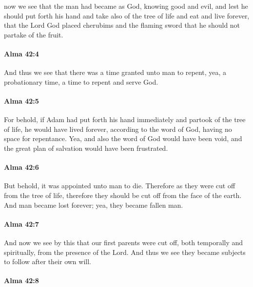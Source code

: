 			now we see that the man had became as God, knowing good and evil,
			and lest he should put forth his hand
			and take also of the tree of life and eat and live forever,
			that the Lord God placed cherubims and the flaming sword
			that he should not partake of the fruit.

		\paragraph{Alma 42:4} %
			\label{ALMA-42-4}

			And thus we see that there was a time granted unto man to repent,
			yea, a probationary time, a time to repent and serve God.

		\paragraph{Alma 42:5} %
			\label{ALMA-42-5}

			For behold, if Adam had put forth his hand immediately
			and partook of the tree of life,
			he would have lived forever, according to the word of God,
			having no space for repentance.
			Yea, and also the word of God would have been void,
			and the great plan of salvation would have been frustrated.

		\paragraph{Alma 42:6} %
			\label{ALMA-42-6}

			But behold, it was appointed unto man to die.
			Therefore as they were cut off from the tree of life,
			therefore they should be cut off from the face of the earth.
			And man became lost forever;
			yea, they became fallen man.

		\paragraph{Alma 42:7} %
			\label{ALMA-42-7}

			And now we see by this that our first parents were cut off,
			both temporally and spiritually, from the presence of the Lord.
			And thus we see they became subjects to follow after their own will.

		\paragraph{Alma 42:8} %
			\label{ALMA-42-8}

